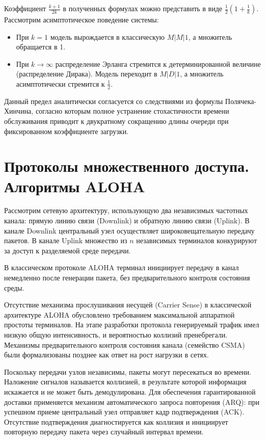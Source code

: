 \begin{note}
Коэффициент $\frac{k+1}{2k}$ в полученных формулах можно представить в виде $\frac{1}{2}\left(1 + \frac{1}{k}\right)$. Рассмотрим асимптотическое поведение системы:
\begin{itemize}
    \item При $k = 1$ модель вырождается в классическую $M|M|1$, а множитель обращается в 1.
    \item При $k \to \infty$ распределение Эрланга стремится к детерминированной величине (распределение Дирака). Модель переходит в $M|D|1$, а множитель асимптотически стремится к $\frac{1}{2}$. 
\end{itemize}
Данный предел аналитически согласуется со следствиями из формулы Полячека-Хинчина, согласно которым полное устранение стохастичности времени обслуживания приводит к двукратному сокращению длины очереди при фиксированном коэффициенте загрузки.
\end{note}

\section{Протоколы множественного доступа. Алгоритмы ALOHA}

Рассмотрим сетевую архитектуру, использующую два независимых частотных канала: прямую линию связи (Downlink) и обратную линию связи (Uplink). В канале Downlink центральный узел осуществляет широковещательную передачу пакетов. В канале Uplink множество из $n$ независимых терминалов конкурируют за доступ к разделяемой среде передачи.

В классическом протоколе ALOHA терминал инициирует передачу в канал немедленно после генерации пакета, без предварительного контроля состояния среды.

\begin{note}
Отсутствие механизма прослушивания несущей (Carrier Sense) в классической архитектуре ALOHA обусловлено требованием максимальной аппаратной простоты терминалов. На этапе разработки протокола генерируемый трафик имел низкую общую интенсивность, и вероятностью коллизий пренебрегали. Механизмы предварительного контроля состояния канала (семейство CSMA) были формализованы позднее как ответ на рост нагрузки в сетях.
\end{note}

Поскольку передачи узлов независимы, пакеты могут пересекаться во времени. Наложение сигналов называется коллизией, в результате которой информация искажается и не может быть демодулирована. Для обеспечения гарантированной доставки применяется механизм автоматического запроса повторения (ARQ): при успешном приеме центральный узел отправляет кадр подтверждения (ACK). Отсутствие подтверждения диагностируется как коллизия и инициирует повторную передачу пакета через случайный интервал времени.

